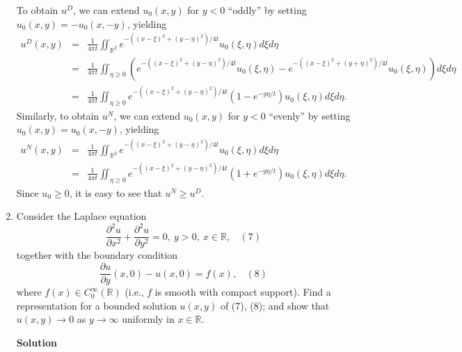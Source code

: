 \documentclass{article}
\begin{document}
\begin{enumerate}
To obtain \(u^D\), we can extend \(u_0(x,y)\) for \(y < 0\) ``oddly'' by setting \(u_0(x,y) = -u_0(x,-y)\), yielding
\begin{eqnarray*}
u^D(x,y) & = & \frac{1}{4 \pi t} \iint_{\mathbb{R}^2} e^{-\left( (x - \xi)^2 + (y - \eta)^2 \right) / 4 t} u_0(\xi,\eta) d\xi d\eta \\
         & = & \frac{1}{4 \pi t} \iint_{\eta \geq 0} \left( e^{-\left( (x - \xi)^2 + (y - \eta)^2 \right) / 4 t} u_0(\xi,\eta) - e^{-\left( (x - \xi)^2 + (y + \eta)^2 \right) / 4 t} u_0(\xi,\eta) \right) d\xi d\eta \\
         & = & \frac{1}{4 \pi t} \iint_{\eta \geq 0} e^{-\left( (x - \xi)^2 + (y - \eta)^2 \right) / 4 t} \left( 1 - e^{-y \eta / t} \right) u_0(\xi,\eta) d\xi d\eta.
\end{eqnarray*}
Similarly, to obtain \(u^N\), we can extend \(u_0(x,y)\) for \(y < 0\) ``evenly'' by setting \(u_0(x,y) = u_0(x,-y)\), yielding
\begin{eqnarray*}
u^N(x,y) & = & \frac{1}{4 \pi t} \iint_{\mathbb{R}^2} e^{-\left( (x - \xi)^2 + (y - \eta)^2 \right) / 4 t} u_0(\xi,\eta) d\xi d\eta \\
         & = & \frac{1}{4 \pi t} \iint_{\eta \geq 0} e^{-\left( (x - \xi)^2 + (y - \eta)^2 \right) / 4 t} \left( 1 + e^{-y \eta / t} \right) u_0(\xi,\eta) d\xi d\eta.
\end{eqnarray*}
Since \(u_0 \geq 0\), it is easy to see that \(u^N \geq u^D\).



\item Consider the Laplace equation
\[\frac{\partial^2 u}{\partial x^2} + \frac{\partial^2 u}{\partial y^2} = 0, \ y > 0, \ x \in \mathbb{R}, \ \ \ \ (7)\]
together with the boundary condition
\[\frac{\partial u}{\partial y}(x,0) - u(x,0) = f(x), \ \ \ \ (8)\]
where \(f(x) \in C_0^{\infty}(\mathbb{R})\) (i.e., \(f\) is smooth with compact support).  Find a representation for a bounded solution \(u(x,y)\) of (7), (8); and show that \(u(x,y) \to 0\) as \(y \to \infty\) uniformly in \(x \in \mathbb{R}\).

{\bf Solution}


\end{enumerate}
\end{document}
